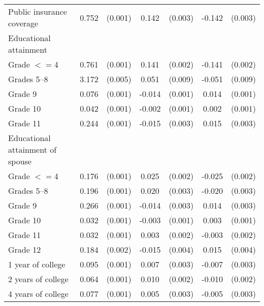 \begin{tabular}{lcccccc}
 \hspace{0.3cm}  Public insurance coverage  & 0.752 & (0.001)  & 0.142 & (0.003)  & -0.142 & (0.003)  \\
 Educational attainment  & & &  \\
 \hspace{0.3cm} Grade $<=$4  & 0.761 & (0.001)  & 0.141 & (0.002)  & -0.141 & (0.002)  \\
 \hspace{0.3cm}  Grades 5--8  & 3.172 & (0.005)  & 0.051 & (0.009)  & -0.051 & (0.009)  \\
 \hspace{0.3cm} Grade 9  & 0.076 & (0.001)  & -0.014 & (0.001)  & 0.014 & (0.001)  \\
 \hspace{0.3cm} Grade 10  & 0.042 & (0.001)  & -0.002 & (0.001)  & 0.002 & (0.001)  \\
 \hspace{0.3cm} Grade 11  & 0.244 & (0.001)  & -0.015 & (0.003)  & 0.015 & (0.003)  \\
 Educational attainment of spouse  & & &  \\
 \hspace{0.3cm} Grade $<=$4  & 0.176 & (0.001)  & 0.025 & (0.002)  & -0.025 & (0.002)  \\
 \hspace{0.3cm}  Grades 5--8  & 0.196 & (0.001)  & 0.020 & (0.003)  & -0.020 & (0.003)  \\
 \hspace{0.3cm} Grade 9  & 0.266 & (0.001)  & -0.014 & (0.003)  & 0.014 & (0.003)  \\
 \hspace{0.3cm} Grade 10  & 0.032 & (0.001)  & -0.003 & (0.001)  & 0.003 & (0.001)  \\
 \hspace{0.3cm} Grade 11  & 0.032 & (0.001)  & 0.003 & (0.002)  & -0.003 & (0.002)  \\
 \hspace{0.3cm} Grade 12  & 0.184 & (0.002)  & -0.015 & (0.004)  & 0.015 & (0.004)  \\
 \hspace{0.3cm} 1 year of college  & 0.095 & (0.001)  & 0.007 & (0.003)  & -0.007 & (0.003)  \\
 \hspace{0.3cm} 2 years of college  & 0.064 & (0.001)  & 0.010 & (0.002)  & -0.010 & (0.002)  \\
 \hspace{0.3cm} 4 years of college  & 0.077 & (0.001)  & 0.005 & (0.003)  & -0.005 & (0.003)  \\

\end{tabular}
